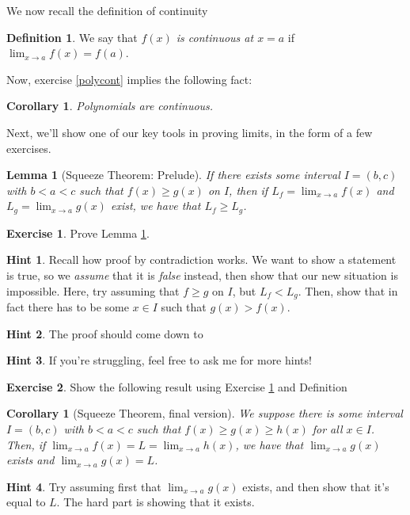 \documentclass[english]{book}
\newtheorem{corollary}[theorem]{Corollary}
\newtheorem{lemma}[theorem]{Lemma}
\theoremstyle{remark}
\theoremstyle{definition}
\newtheorem{excs}{Exercise}
\newtheorem{hint}{Hint}[excs]
\newtheorem{definition}[theorem]{Definition}
\newtheorem*{next week}{Next Week}
\newcommand{\dlim}{\displaystyle\lim}
\begin{document}
We now recall the definition of continuity
\begin{definition}
	We say that \emph{$f(x)$ is continuous at $x=a$} if $\lim_{x\to a}f(x)=f(a)$.
\end{definition}
Now, exercise \ref{polycont} implies the following fact:
\begin{corollary}
	Polynomials are continuous.
\end{corollary}

Next, we'll show one of our key tools in proving limits, in the form of a few exercises.
\begin{lemma}[Squeeze Theorem: Prelude]\label{lem:presqz}
	If there exists some interval $I=(b,c)$ with $b<a<c$ such that $f(x)\geq g(x)$ on $I$, then if $L_f=\dlim_{x\to a}f(x)$ and $L_g=\dlim_{x\to a}g(x)$ exist, we have that $L_f\geq L_g$.
\end{lemma}
\begin{excs}\label{excs:presqz}
Prove Lemma \ref{lem:presqz}.
\end{excs}
\begin{hint}
	Recall how proof by contradiction works. We want to show a statement is true, so we \emph{assume} that it is \emph{false} instead, then show that our new situation is impossible. Here, try assuming that $f\geq g$ on $I$, but $L_f<L_g$. Then, show that in fact there has to be some $x\in I$ such that $g(x)>f(x)$.
\end{hint}
\begin{hint}
The proof should come down to 
\end{hint}
\begin{hint}
	If you're struggling, feel free to ask me for more hints!
\end{hint}
\begin{excs}\label{excs:sqz}
	Show the following result using Exercise \ref{excs:presqz} and Definition
	\begin{corollary}[Squeeze Theorem, final version]
		We suppose there is some interval $I=(b,c)$ with $b<a<c$ such that $f(x)\geq g(x)\geq h(x)$ for all $x\in I$. Then, if $\lim_{x\to a}f(x)=L=\lim_{x\to a}h(x)$, we have that $\lim_{x\to a}g(x)$ exists and $\lim_{x\to a}g(x)=L$.
	\end{corollary}
\begin{hint}
Try assuming first that $\lim_{x\to a}g(x)$ exists, and then show that it's equal to $L$. The hard part is showing that it exists.
\end{hint}\end{excs}
\end{document}
